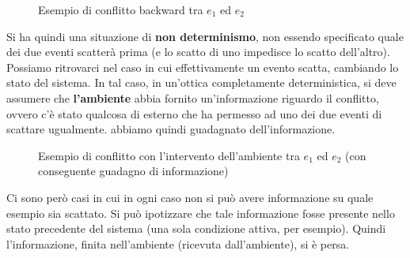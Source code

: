 \begin{definizione}
\begin{enumerate}
\begin{figure}[H]
      \caption{Esempio di conflitto backward tra $e_1$ ed $e_2$}
    \end{figure}
  \end{enumerate}
  Si ha quindi una situazione di \textbf{non determinismo}, non essendo
  specificato quale dei due eventi scatterà prima (e lo scatto di uno impedisce
  lo scatto dell'altro).
  Possiamo ritrovarci nel caso in cui effettivamente un evento scatta, cambiando lo
  stato del sistema. In tal caso, in un'ottica completamente deterministica, si
  deve assumere che \textbf{l'ambiente} abbia fornito un'informazione
  riguardo il conflitto, ovvero c'è stato qualcosa di esterno che ha permesso ad
  uno dei due eventi di scattare ugualmente. abbiamo quindi guadagnato
  dell'informazione. 
  \begin{figure}[H]
    \centering
    \caption{Esempio di conflitto con l'intervento dell'ambiente tra $e_1$ ed
      $e_2$ (con conseguente guadagno di informazione)} 
  \end{figure}
  Ci sono però casi in cui in ogni caso non si può avere informazione su quale
  esempio sia scattato. Si può ipotizzare che tale informazione fosse presente
  nello stato precedente del sistema (una sola condizione attiva, per
  esempio). Quindi l'informazione, finita nell'ambiente (ricevuta
  dall'ambiente), si è persa.
  \begin{figure}[H]
    \centering
\end{figure}
\end{definizione}
